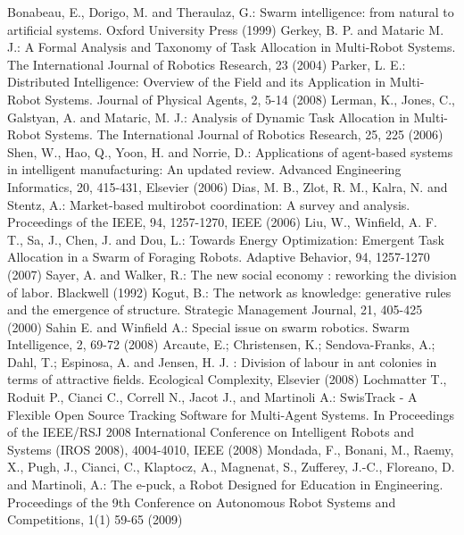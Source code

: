 \documentclass{llncs}
\begin{document}
\begin{thebibliography}{}
Bonabeau, E., Dorigo, M. and Theraulaz, G.:
Swarm intelligence: from natural to artificial systems.
Oxford University Press (1999)
Gerkey, B. P. and Mataric M. J.:
A Formal Analysis and Taxonomy of Task Allocation in Multi-Robot Systems.
The International Journal of Robotics Research, 23 (2004)
Parker, L. E.:
Distributed Intelligence: Overview of the Field and its Application in Multi-Robot Systems.
Journal of Physical Agents, 2, 5-14 (2008)
Lerman, K., Jones, C., Galstyan, A. and Mataric, M. J.:
Analysis of Dynamic Task Allocation in Multi-Robot Systems. 
The International Journal of Robotics Research, 25, 225 (2006)
Shen, W., Hao, Q., Yoon, H. and Norrie, D.:
Applications of agent-based systems in intelligent manufacturing: An updated review. Advanced Engineering Informatics, 20, 415-431, Elsevier (2006)
Dias, M. B., Zlot, R. M., Kalra, N. and Stentz, A.:
Market-based multirobot coordination: A survey and analysis. 
Proceedings of the IEEE, 94, 1257-1270, IEEE (2006)
Liu, W., Winfield, A. F. T., Sa, J., Chen, J. and Dou, L.:
Towards Energy Optimization: Emergent Task Allocation in a Swarm of Foraging Robots. Adaptive Behavior, 94, 1257-1270 (2007)
Sayer, A. and Walker, R.: 
The new social economy : reworking the division of labor.
Blackwell (1992)
Kogut, B.: 
The network as knowledge: generative rules and the emergence of structure. 
Strategic Management Journal, 21, 405-425 (2000)
Sahin E. and Winfield A.: 
Special issue on swarm robotics.
Swarm Intelligence, 2, 69-72 (2008)
Arcaute, E.; Christensen, K.; Sendova-Franks, A.; Dahl, T.; Espinosa, A. and Jensen, H. J. : 
Division of labour in ant colonies in terms of attractive fields. 
Ecological Complexity, Elsevier (2008)
Lochmatter T., Roduit P., Cianci C., Correll N., Jacot J., and Martinoli A.: 
SwisTrack - A Flexible Open Source Tracking Software for Multi-Agent Systems. 
In Proceedings of the IEEE/RSJ 2008 International Conference on Intelligent Robots and Systems (IROS 2008), 4004-4010, IEEE (2008)
Mondada, F., Bonani, M., Raemy, X., Pugh, J., Cianci, C., Klaptocz, A., Magnenat, S., Zufferey, J.-C., Floreano, D. and Martinoli, A.:
The e-puck, a Robot Designed for Education in Engineering. 
Proceedings of the 9th Conference on Autonomous Robot Systems and Competitions, 1(1) 59-65 (2009)
\end{thebibliography}
%
\end{document}
